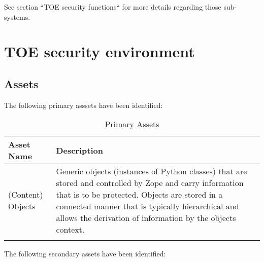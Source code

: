 \documentclass[12pt,english]{scrbook}
\begin{document}
See section ``TOE security functions`` %
for more details regarding those sub-systems.




\chapter{TOE security environment}





\section{Assets}

The following primary asssets have been identified:

\begin{longtable}[c]{lp{10cm}}
  \toprule 
  Asset Name & Description \\
  \midrule\endhead

  (Content) Objects & 
  Generic objects (instances of Python classes) that
  are stored and controlled by Zope and carry
  information that is to be protected. Objects are
  stored in a connected manner that is typically
  hierarchical and allows the derivation of
  information by the objects context. \\
  \bottomrule
  \caption{Primary Assets}
  \label{tab-assets}
\end{longtable}

The following secondary assets have been identified:
\end{document}
